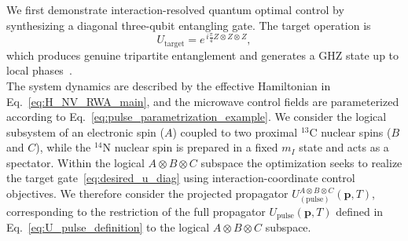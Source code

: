 
\noindent
We first demonstrate interaction-resolved quantum optimal control by synthesizing a diagonal three-qubit entangling gate. The target operation is
\begin{equation}
\label{eq:desired_u_diag}
U_{\mathrm{target}} = e^{\,i\frac{\pi}{4} Z\!\otimes\!Z\!\otimes\!Z},
\end{equation}
which produces genuine tripartite entanglement and generates a GHZ state up to local phases~\cite{coffman2000distributed,dur2000three}.\\

\noindent
The system dynamics are described by the effective Hamiltonian in Eq.~\eqref{eq:H_NV_RWA_main}, and the microwave control fields are parameterized according to Eq.~\eqref{eq:pulse_parametrization_example}. We consider the logical subsystem of an electronic spin ($A$) coupled to two proximal $^{13}$C nuclear spins ($B$ and $C$), while the $^{14}$N nuclear spin is prepared in a fixed $m_I$ state and acts as a spectator. Within the logical $A\!\otimes\!B\!\otimes\!C$ subspace the optimization seeks to realize the target gate~\eqref{eq:desired_u_diag} using interaction-coordinate control objectives. We therefore consider the projected propagator $U^{A\otimes B\otimes C}_{(\mathrm{pulse})}(\mathbf p,T)$, corresponding to the restriction of the full propagator $U_{\mathrm{pulse}}(\mathbf p,T)$ defined in Eq.~\eqref{eq:U_pulse_definition} to the logical $A\!\otimes\!B\!\otimes\!C$ subspace.\\

